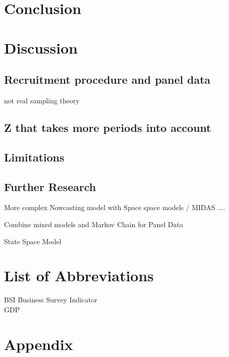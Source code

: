 \documentclass[12pt,a4paper,oneside]{book}
\begin{document}
\chapter{Conclusion}


\chapter{Discussion}

\section*{Recruitment procedure and panel data}
not real sampling theory



\section*{Z that takes more periods into account}



\section*{Limitations}


\section*{Further Research}

More complex Nowcasting model with Space space models / MIDAS ....

Combine mixed models and Markov Chain for Panel Data \citep{de_haan-rietdijk_use_2017} 

State Space Model



\nocite{hlavac_stargazer:_2018}


 

\chapter*{List of Abbreviations}
  BSI Business Survey Indicator \\
  GDP   \\
  
\begin{appendix}
  \listoffigures
  \listoftables
\end{appendix}


\chapter*{Appendix}
\end{document}
